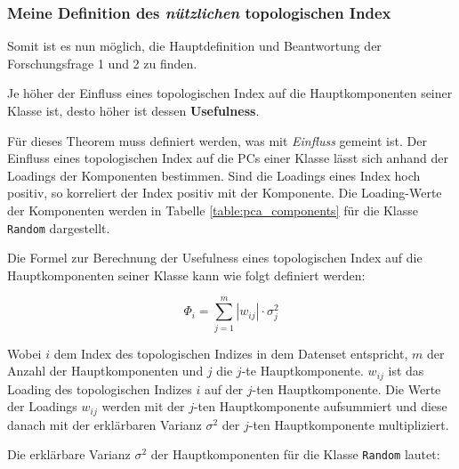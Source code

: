 \subsubsection{Meine Definition des \textit{nützlichen} topologischen Index}

Somit ist es nun möglich, die Hauptdefinition und Beantwortung der Forschungsfrage 1 und 2 zu finden.

\begin{theorem}
    \label{thm:useful_index}%
    Je höher der Einfluss eines topologischen Index auf die Hauptkomponenten seiner Klasse ist, desto höher ist dessen \textbf{Usefulness}.
\end{theorem}

Für dieses Theorem muss definiert werden, was mit \textit{Einfluss} gemeint ist.
Der Einfluss eines topologischen Index auf die PCs einer Klasse lässt sich anhand der Loadings der Komponenten bestimmen.
Sind die Loadings eines Index hoch positiv, so korreliert der Index positiv mit der Komponente.
Die Loading-Werte der Komponenten werden in Tabelle \ref{table:pca_components} für die Klasse \texttt{Random} dargestellt.

Die Formel zur Berechnung der Usefulness eines topologischen Index auf die Hauptkomponenten seiner Klasse kann wie folgt definiert werden:

\begin{equation}
    \label{eq:index_usefulness}
    \Phi_{i} = \sum_{j=1}^{m} |w_{ij}| \cdot \sigma^2_j
\end{equation}

Wobei $i$ dem Index des topologischen Indizes in dem Datenset entspricht, $m$ der Anzahl der Hauptkomponenten und $j$ die $j$-te Hauptkomponente. $w_{ij}$ ist das Loading des topologischen Indizes $i$ auf der $j$-ten Hauptkomponente.
Die Werte der Loadings $w_{ij}$ werden mit der $j$-ten Hauptkomponente aufsummiert und diese danach  mit der erklärbaren Varianz $\sigma^2$ der $j$-ten Hauptkomponente multipliziert.

Die erklärbare Varianz $\sigma^2$ der Hauptkomponenten für die Klasse \texttt{Random} lautet:


